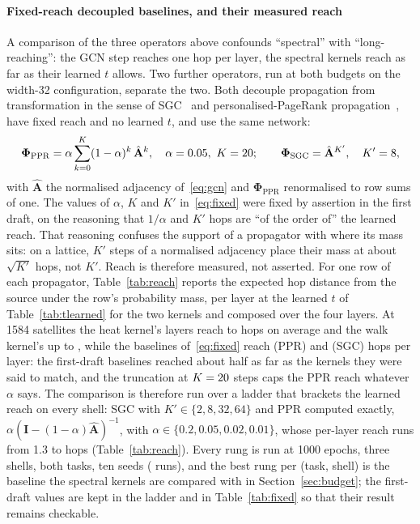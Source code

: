\documentclass[preprint,11pt,3p]{elsarticle}
\newcommand{\Phiop}{\boldsymbol{\Phi}}
\begin{document}
\paragraph{Fixed-reach decoupled baselines, and their measured reach}
A comparison of the three operators above confounds ``spectral'' with ``long-reaching'': the GCN
step reaches one hop per layer, the spectral kernels reach as far as their learned $t$ allows.
Two further operators, run at both budgets on the width-32 configuration, separate the two. Both
decouple propagation from transformation in the sense of SGC~\cite{sgc} and personalised-PageRank
propagation~\cite{appnp}, have fixed reach and no learned $t$, and use the same network:
\begin{equation}
\Phiop_{\mathrm{PPR}} = \alpha \sum_{k=0}^{K} (1-\alpha)^{k}\,\hat{\mathbf{A}}^{k},\quad
\alpha=\numPprAlpha,\ K=\numPprK;\qquad
\Phiop_{\mathrm{SGC}} = \hat{\mathbf{A}}^{K'},\quad K'=\numSgcK,
\label{eq:fixed}
\end{equation}
with $\hat{\mathbf{A}}$ the normalised adjacency of~\eqref{eq:gcn} and $\Phiop_{\mathrm{PPR}}$
renormalised to row sums of one. The values of $\alpha$, $K$ and $K'$ in~\eqref{eq:fixed} were
fixed by assertion in the first draft, on the reasoning that $1/\alpha$ and $K'$ hops are ``of the
order of'' the learned reach. That reasoning confuses the support of a propagator with where its
mass sits: on a lattice, $K'$ steps of a normalised adjacency place their mass at about
$\sqrt{K'}$ hops, not $K'$. Reach is therefore measured, not asserted. For one row of each
propagator, Table~\ref{tab:reach} reports the expected hop distance from the source under the
row's probability mass, per layer at the learned $t$ of Table~\ref{tab:tlearned} for the two
kernels and composed over the four layers. At 1584 satellites the heat kernel's layers reach
\numReachHeatLayerOneShellOne{} to \numReachHeatMeanShellOne{} hops on average and the walk
kernel's up to \numReachWalkLayerFourShellOne{}, while the baselines of~\eqref{eq:fixed} reach
\numReachPprRoundOneShellOne{} (PPR) and \numReachSgcEightShellOne{} (SGC) hops per layer: the
first-draft baselines reached about half as far as the kernels they were said to match, and the
truncation at $K=20$ steps caps the PPR reach whatever $\alpha$ says. The comparison is
therefore run over a ladder that brackets the learned reach on every shell: SGC with
$K'\in\{2,8,32,64\}$ and PPR computed exactly, $\alpha(\mathbf{I}-(1-\alpha)\hat{\mathbf{A}})^{-1}$,
with $\alpha\in\{0.2,0.05,0.02,0.01\}$, whose per-layer reach runs from 1.3 to
\numReachPprExactOneDouble{} hops (Table~\ref{tab:reach}). Every rung is run at 1000 epochs, three
shells, both tasks, ten seeds (\numLadderRuns{} runs), and the best rung per (task, shell) is the
baseline the spectral kernels are compared with in Section~\ref{sec:budget}; the first-draft
values are kept in the ladder and in Table~\ref{tab:fixed} so that their result remains
checkable.
\end{document}
